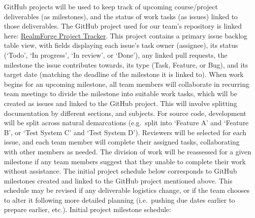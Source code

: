 GitHub projects will be used to keep track of upcoming course/project 
deliverables (as milestones), and the status of work tasks (as issues) linked 
to those deliverables. The GitHub project used for our team's repository is 
linked here: 
\href{https://github.com/orgs/Aeolus-Software/projects/2}{{RealmForge 
Project Tracker}}. This project contains a primary issue backlog 
table view, with fields displaying each issue's task owner (assignee), its 
status (`Todo', `In progress', `In review', or `Done'), any linked pull 
requests, the milestone the issue contributes towards, its type (Task, Feature, 
or Bug), and its target date (matching the deadline of the milestone it is 
linked to).
\newline \newline
When work begins for an upcoming 
milestone, all team members will collaborate in recurring team meetings to 
divide the milestone into 
suitable work tasks, which will be created as issues and linked to the GitHub 
project. This will involve splitting documentation by different sections, and 
subjects. For source code, development will be split across natural 
demarcations (e.g.~split into `Feature A' and `Feature B', or `Test System C' 
and `Test System D'). Reviewers will be selected for each issue, and each team 
member will complete their assigned tasks, collaborating with other members as 
needed. The division of work will be reassessed for a given milestone if any 
team members suggest that they unable to complete their work without assistance.
\newline \newline
The initial project schedule below corresponds to GitHub milestones created and 
linked to the GitHub project mentioned above. This schedule may be revised if 
any deliverable logistics change, or 
if the team chooses to alter it following more detailed planning (i.e.~pushing 
due dates earlier to prepare earlier, etc.).
\newline \newline
\noindent Initial project milestone schedule:

